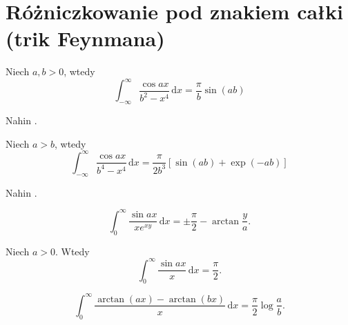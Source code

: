 %

\section{Różniczkowanie pod znakiem całki (trik Feynmana)}


\begin{problem}
    Niech $a, b > 0$, wtedy
    \begin{equation}
        \int_{-\infty}^\infty \frac{\cos ax}{b^2 - x^4} \,\mathrm{d} x = \frac{\pi}{b} \sin (ab)
    \end{equation}
\end{problem}

\begin{solution}
    Nahin \cite[s. 115, 375, 376]{nahin15}.
\end{solution}

\begin{problem}
    Niech $a > b$, wtedy
    \begin{equation}
        \int_{-\infty}^\infty \frac{\cos ax}{b^4 - x^4} \,\mathrm{d} x = \frac{\pi}{2b^3} [\sin (ab) + \exp (-ab)]
    \end{equation}
\end{problem}

\begin{solution}
    Nahin \cite[s. 115, 376]{nahin15}.
\end{solution}

\begin{problem}
    \begin{equation}
        \int_0^\infty \frac{\sin ax}{x e^{xy}} \,\mathrm{d}x = \pm \frac \pi 2 - \arctan \frac y a.
    \end{equation}
\end{problem}

\begin{problem}
    Niech $a > 0$.
    Wtedy
    \begin{equation}
        \int_0^\infty \frac{\sin ax}{x} \,\mathrm{d}x = \frac \pi 2.
    \end{equation}
\end{problem}

\begin{problem}
    \begin{equation}
        \int_0^\infty \frac{\arctan (ax) - \arctan (bx)}{x} \,\mathrm{d}x = \frac \pi 2 \log \frac a b.
    \end{equation}
\end{problem}

